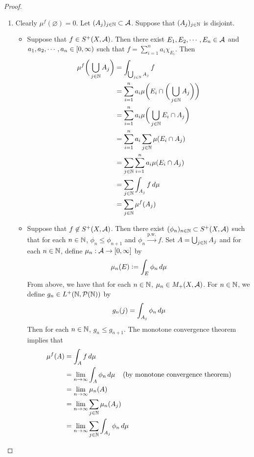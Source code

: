 \documentclass{book}
\begin{document}
	\begin{proof}\
		\begin{enumerate}
			\item Clearly $\mu^f(\varnothing) = 0$. Let $(A_j)_{j \in \mathbb{N}} \subset \mathcal{A}$. Suppose that $(A_j)_{j \in \mathbb{N}}$ is disjoint. 
			\begin{itemize}
				\item Suppose that $f \in S^+(X, \mathcal{A})$. Then there exist $E_1, E_2, \cdots, E_n \in \mathcal{A}$ and  $a_1, a_2, \cdots, a_n \in [0,\infty)$ such that $f = \sum\limits_{i=1}^n a_i \chi_{E_i}$. Then 
				\begin{align*}
					\mu^f\bigg(\bigcup_{j \in \mathbb{N}} A_j\bigg) 
					&= \int_{\bigcup_{j \in \mathbb{N}} A_j} f\\
					&= \sum\limits_{i = 1} ^n a_i\mu\bigg(E_i \cap \bigg(\bigcup_{j \in \mathbb{N}} A_j\bigg)\bigg)\\
					&= \sum\limits_{i = 1} ^n a_i\mu\bigg(\bigcup_{j \in \mathbb{N}} E_i \cap A_j\bigg)\\
					&= \sum\limits_{i = 1} ^n a_i \sum\limits_{j \in \mathbb{N}} \mu(E_i \cap A_j)\\
					&= \sum\limits_{j \in \mathbb{N}} \sum\limits_{i = 1} ^n a_i \mu(E_i \cap A_j)\\
					&= \sum\limits_{j \in \mathbb{N}} \int_{A_j} f \, d \mu\\
					&= \sum\limits_{j \in \mathbb{N}} \mu^f(A_j)
				\end{align*}  
				\item Suppose that $f \not \in S^+(X, \mathcal{A})$. Then there exist $(\phi_n)_{n \in \mathbb{N}} \subset S^+(X, \mathcal{A})$ such that for each $n \in \mathbb{N}$, $\phi_n \leq \phi_{n+1}$ and $\phi_n \xrightarrow{\text{p.w.}} f$. Set $A = \bigcup_{j \in \mathbb{N}} A_j$ and for each $n \in \mathbb{N}$, define $\mu_n: \mathcal{A} \rightarrow [0,\infty]$ by 
				$$\mu_n(E) \vcentcolon= \int_E \phi_n \, d \mu$$ 
				From above, we have that for each $n \in \mathbb{N}$, $\mu_n \in M_+(X, \mathcal{A})$. For $n \in \mathbb{N}$, we define $g_n \in L^+(\mathbb{N}, \mathcal{P}(\mathbb{N}))$ by 
				$$g_n(j) = \int_{A_j} \phi_n \, d \mu $$ 
				Then for each $n \in \mathbb{N}$, $g_n \leq g_{n+1}$. 
				The monotone convergence theorem implies that
				\begin{align*}
					\mu^f(A) 
					& = \int_A f \dmu\\
					& = \limn \int_A \phi_n \dmu \hspace{4mm} \text{(by monotone convergence theorem)} \\ 
					& = \limn \mu_n(A) \\
					& = \limn \sum\limits_{j \in \N} \mu_n(A_j)  \\
					& = \limn \sum\limits_{j \in \N} \int_{A_j} \phi_n \dmu\\

\end{align*}
\end{itemize}
\end{enumerate}
\end{proof}
\end{document}
